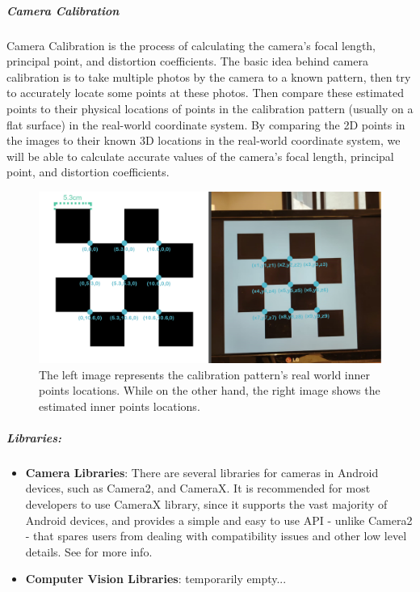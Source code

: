 \subparagraph{Camera Calibration}
\label{Camera Calibration Background}
Camera Calibration is the process of calculating the camera's focal length, principal point, and distortion coefficients. The basic idea behind camera calibration is to take multiple photos by the camera to a known pattern, then try to accurately locate some points at these photos. Then compare these estimated points to their physical locations of points in the calibration pattern (usually on a flat surface) in the real-world coordinate system. By comparing the 2D points in the images to their known 3D locations in the real-world coordinate system, we will be able to calculate accurate values of the camera's focal length, principal point, and distortion coefficients.

\begin{figure}[h] %
	\centering
	\includegraphics[width=\textwidth]{assets/ch3/calibration illustration image/calibration illustration image.png}
	\caption{ The left image represents the calibration pattern's real world inner points locations. While on the other hand, the right image shows the estimated inner  points locations. }
	\label{Calibration_Illustrator}
\end{figure}

\subparagraph{Libraries:}
\label{localization libraries BG}
\begin{itemize}
\item \textbf{Camera Libraries}:
There are several libraries for cameras in Android devices, such as Camera2, and CameraX. It is recommended for most developers to use CameraX library, since it supports the vast majority of Android devices, and provides a simple and easy to use API - unlike Camera2 - that spares users from dealing with compatibility issues and other low level details. See \cite{whichCameraLibToUse} for more info.
\end{itemize}
\begin{itemize}
	\item \textbf{Computer Vision Libraries}:
	\color{green}temporarily empty...\color{black}
\end{itemize}

